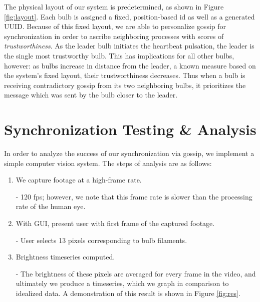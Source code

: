 \documentclass[preprint,review,12pt]{cs262}
\begin{document}
The physical layout of our system is predetermined, as shown in Figure \ref{fig:layout}. Each bulb is assigned a fixed, position-based id as well as a generated UUID. Because of this fixed layout, we are able to personalize gossip for synchronization in order to ascribe neighboring processes with scores of \emph{trustworthiness}. As the leader bulb initiates the heartbeat pulsation, the leader is the single most trustworthy bulb. This has implications for all other bulbs, however: as bulbs increase in distance from the leader, a known measure based on the system's fixed layout, their trustworthiness decreases. Thus when a bulb is receiving contradictory gossip from its two neighboring bulbs, it prioritizes the message which was sent by the bulb closer to the leader.  

\section{Synchronization Testing \& Analysis}

In order to analyze the success of our synchronization via gossip, we implement a simple computer vision system. The steps of analysis are as follows: 

\begin{enumerate} 
\item We capture footage at a high-frame rate. 

- 120 fps; however, we note that this frame rate is slower than the processing rate of the human eye. 

\item With GUI, present user with first frame of the captured footage. 

- User selects 13 pixels corresponding to bulb filaments. 

\item Brightness timeseries computed. 

- The brightness of these pixels are averaged for every frame in the video, and ultimately we produce a timeseries, which we graph in comparison to idealized data. A demonstration of this result is shown in Figure \ref{fig:res}. 
\end{enumerate}
\end{document}
